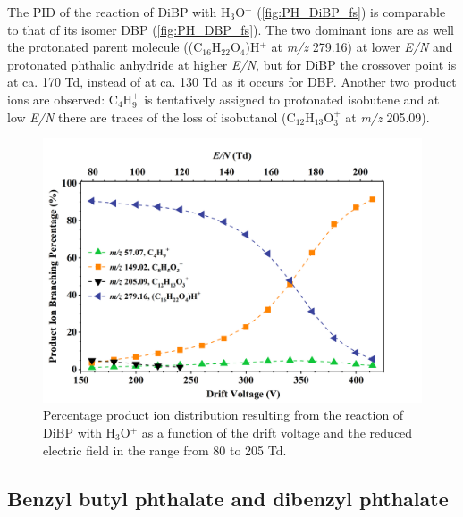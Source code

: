 The PID of the reaction of DiBP with H$_3$O$^+$ (\autoref{fig:PH_DiBP_fs}) is comparable to that of its isomer DBP (\autoref{fig:PH_DBP_fs}).
The two dominant ions are as well the protonated parent molecule ((C$_{16}$H$_{22}$O$_4$)H$^+$ at \textit{m/z} 279.16) at lower \textit{E/N} and protonated phthalic anhydride at higher \textit{E/N}, but for DiBP the crossover point is at ca. 170 Td, instead of at ca. 130 Td as it occurs for DBP.
Another two product ions are observed:  C$_4$H$_9^+$ is tentatively assigned to protonated isobutene and 
at low \textit{E/N} there are traces of the loss of isobutanol (C$_{12}$H$_{13}$O$_3^+$ at \textit{m/z} 205.09).




\begin{figure}[htb]%
\centering
\includegraphics[height=0.4\textheight]{pics/DiBP-BR.png}
\caption{Percentage product ion distribution resulting from the reaction of DiBP with H$_3$O$^+$ as a function of the drift voltage and the reduced electric field in the range from 80 to 205 Td.}
\label{fig:PH_DiBP_fs}
\end{figure}

\subsection{Benzyl butyl phthalate
and dibenzyl phthalate}



